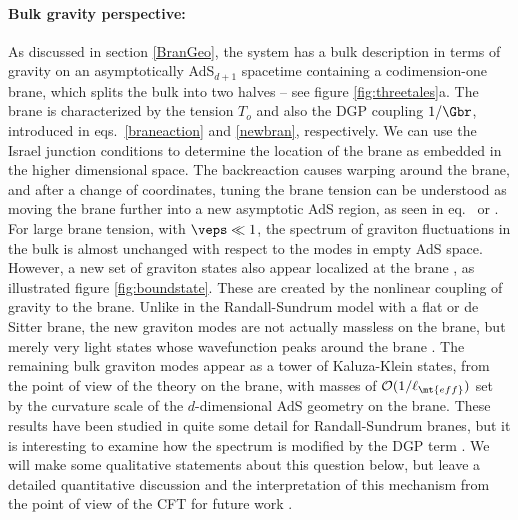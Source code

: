 \paragraph{Bulk gravity perspective:} As discussed in section \ref{BranGeo}, the system has a bulk description in terms of gravity on an asymptotically AdS$_{d+1}$ spacetime containing a codimension-one brane, which splits the bulk into two halves -- see figure \ref{fig:threetales}a. The brane is characterized by the tension $T_o$ and also the DGP coupling $1/\Gbr$, introduced in eqs.~\eqref{braneaction} and \eqref{newbran}, respectively. We can use the Israel junction conditions  to determine the location of the brane as embedded in the higher dimensional space. The backreaction causes warping around the brane, and after a change of coordinates, tuning the brane tension can be understood as moving the brane further into a new asymptotic AdS region, as seen in eq.~ or . For large brane tension, \ie with $\veps \ll 1$, the spectrum of graviton fluctuations in the bulk is almost unchanged with respect to the modes in empty AdS space. However, a new set of graviton states also appear localized at the brane \cite{Randall:1999vf,Randall:1999ee}, as illustrated figure \ref{fig:boundstate}. These are created by the nonlinear coupling of gravity to the brane. Unlike in the Randall-Sundrum model with a flat or de Sitter brane, the new graviton modes are not actually massless on the brane, but merely very light states whose wavefunction peaks around the brane \cite{Karch:2000ct,Karch:2001jb}. The remaining bulk graviton modes appear as a tower of  Kaluza-Klein states, from the point of view of the theory on the brane, with masses of ${\cal O}(1/\ell_\mt{eff})$ set by the curvature scale of the $d$-dimensional AdS geometry on the brane. These results have been studied in quite some detail \cite{Karch:2000ct,Karch:2001jb,Porrati:2001db,Miemiec:2000eq,Schwartz:2000ip,Porrati:2001gx} for Randall-Sundrum branes, but it is interesting to examine how the spectrum is modified by the DGP term . We will make some qualitative statements about this question below, but leave a detailed quantitative discussion and the interpretation of this mechanism from the point of view of the CFT for future work \cite{domino}. 





